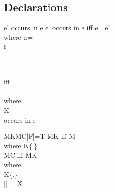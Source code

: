 \subsection{Declarations}
\label{sec:declarations}
{\small
\begin{Define}{e'\textrm{ occurs in }e}
e'\textrm{ occurs in }e\textrm{ iff }e=[e']\\
\quad\textrm{where }::=\square \mid {} \mid {}\mid {} \mid {}\\
\quad{} \mid {}\fstop f \mid {}\mid {}\\
\quad{} \mid {}\\
\quad{} \mid {}\\
\quad{} \mid {}
\end{Define}
\begin{Define}{}
\textrm{ iff }\in\decls\\[1ex]
\\
\quad\textrm{where }\\
\quad{}\in K\\
\quad{}\textrm{ occurs in }e
\end{Define}
\begin{Define}{M\in K\qquad M\in C\qquad|F|=T}
M\in K\textrm{ iff }M\in{}\\
\quad\textrm{where }K\in\{,\}\\
M\in C\textrm{ iff }M\in K\\
\quad\textrm{where }\\
\quad{}K\in\{,\}\\[1ex]
|| = X\\

\end{Define}}
